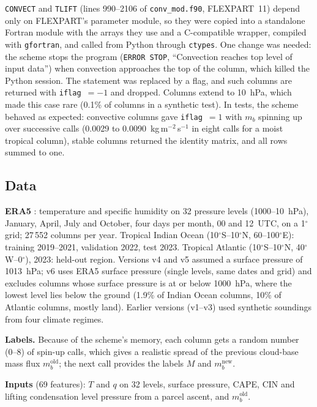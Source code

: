 \documentclass[11pt,a4paper]{article}
\begin{document}
\texttt{CONVECT} and \texttt{TLIFT} (lines 990--2106 of \texttt{conv\_mod.f90}, FLEXPART~11) depend
only on FLEXPART's parameter module, so they were copied into a standalone Fortran module with the
arrays they use and a C-compatible wrapper, compiled with \texttt{gfortran}, and called from Python
through \texttt{ctypes}. One change was needed: the scheme stops the program (\texttt{ERROR STOP},
``Convection reaches top level of input data'') when convection approaches the top of the column, which
killed the Python session. The statement was replaced by a flag, and such columns are returned with
\texttt{iflag}~$=-1$ and dropped. Columns extend to 10~hPa, which made this case rare (0.1\% of
columns in a synthetic test). In tests, the scheme behaved as expected: convective columns gave
\texttt{iflag}~$=1$ with $m_b$ spinning up over successive calls (0.0029 to 0.0090~kg\,m$^{-2}$\,s$^{-1}$
in eight calls for a moist tropical column), stable columns returned the identity matrix, and all rows
summed to one.

\subsection{Data}
\textbf{ERA5} \citep{hersbach2020}: temperature and specific humidity on 32 pressure levels
(1000--10~hPa), January, April, July and October, four days per month, 00 and 12~UTC, on a 1$^\circ$
grid; 27\,552 columns per year. Tropical Indian Ocean (10$^\circ$S--10$^\circ$N, 60--100$^\circ$E):
training 2019--2021, validation 2022, test 2023. Tropical Atlantic (10$^\circ$S--10$^\circ$N,
40$^\circ$W--0$^\circ$), 2023: held-out region. Versions v4 and v5 assumed a surface pressure of
1013~hPa; v6 uses ERA5 surface pressure (single levels, same dates and grid) and excludes columns whose
surface pressure is at or below 1000~hPa, where the lowest level lies below the ground (1.9\% of Indian
Ocean columns, 10\% of Atlantic columns, mostly land). Earlier versions (v1--v3) used synthetic soundings
from four climate regimes.

\textbf{Labels.} Because of the scheme's memory, each column gets a random number (0--8) of spin-up
calls, which gives a realistic spread of the previous cloud-base mass flux $m_b^{\text{old}}$; the next
call provides the labels $M$ and $m_b^{\text{new}}$.

\textbf{Inputs} (69 features): $T$ and $q$ on 32 levels, surface pressure, CAPE, CIN and
lifting condensation level pressure from a parcel ascent, and $m_b^{\text{old}}$.
\end{document}
